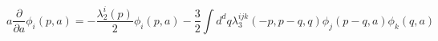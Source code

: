\begin{equation}
a\frac {\partial} {\partial a} \phi_i(p,a)=-\frac {\lambda_2^i(p)}
2 \phi_i(p,a)- \frac 3 2 \int d^dq \lambda_3^{ijk}(-p,p-q,q)
\phi_j(p-q,a) \phi_k(q,a) \label{bca3}
\end{equation}

